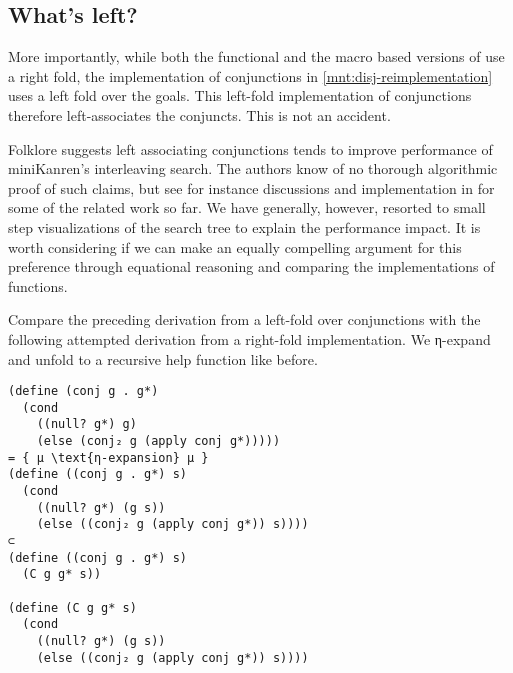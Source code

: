 \documentclass[sigplan,balance=true,pbalance=true,natbib=false]{acmart}
\begin{document}
\subsection{What's left?}\label{sec:whats-left}

More importantly, while both the functional and the macro based
versions of  use a right fold, the implementation of
conjunctions in \cref{mnt:disj-reimplementation} uses a left fold over
the goals. This left-fold implementation of conjunctions therefore
left-associates the conjuncts. This is not an accident.

%
Folklore suggests left associating conjunctions tends to improve
performance of miniKanren's interleaving search. The authors know of
no thorough algorithmic proof of such claims, but see for instance
discussions and implementation in
\citet{rosenblatt2019first} for some of
the related work so far. We have generally, however, resorted to small
step visualizations of the search tree to explain the performance
impact. It is worth considering if we can make an equally compelling
argument for this preference through equational reasoning and
comparing the implementations of functions.



Compare the preceding derivation from a left-fold over conjunctions
with the following attempted derivation from a right-fold
implementation. We η-expand and unfold to a recursive help
function like before.

\begin{verbatim}
(define (conj g . g*)
  (cond
    ((null? g*) g)
    (else (conj₂ g (apply conj g*)))))
= { µ \text{η-expansion} µ }
(define ((conj g . g*) s)
  (cond
    ((null? g*) (g s))
    (else ((conj₂ g (apply conj g*)) s))))
⊂
(define ((conj g . g*) s)
  (C g g* s))

(define (C g g* s)
  (cond
    ((null? g*) (g s))
    (else ((conj₂ g (apply conj g*)) s))))
\end{verbatim}
\end{document}
